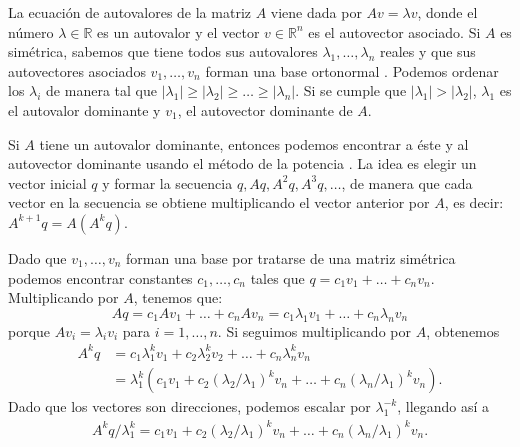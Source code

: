 \documentclass{article}
\begin{document}
La ecuación de autovalores de la matriz $A$ viene dada por $A v = \lambda v$, donde el número $\lambda \in \mathbb{R}$ es un autovalor y el vector $v \in \mathbb{R}^{n}$ es el autovector asociado. Si $A$ es simétrica, sabemos que tiene todos sus autovalores $\lambda_1, \ldots, \lambda_n$ reales y que sus autovectores asociados $v_1, \ldots, v_n$ forman una base ortonormal \citep{strang2022introduction}. Podemos ordenar los $\lambda_i$ de manera tal que $|\lambda_1| \geq |\lambda_2| \geq \ldots \geq |\lambda_n|$. Si se cumple que $|\lambda_1| > |\lambda_2|$, $\lambda_1$ es el autovalor dominante y $v_1$, el autovector dominante de $A$.


Si $A$ tiene un autovalor dominante, entonces podemos encontrar a éste y al autovector dominante usando el método de la potencia \citep{watkins2004fundamentals}. La idea es elegir un vector inicial $q$ y formar la secuencia $q, Aq, A^2q, A^3q, \ldots$, de manera que cada vector en la secuencia se obtiene multiplicando el vector anterior por $A$, es decir: $A^{k+1}q = A(A^{k}q)$. 

Dado que $v_1, \ldots, v_n$ forman una base por tratarse de una matriz simétrica podemos encontrar constantes $c_1, \ldots, c_n$ tales que $q = c_1 v_1 + \ldots + c_n v_n$. Multiplicando por $A$, tenemos que:
%
$$
Aq = c_1 A v_1 + \ldots + c_n A v_n = c_1 \lambda_1 v_1 + \ldots + c_n \lambda_n v_n
$$
%
porque $A v_i = \lambda_i v_i$ para $i = 1, \ldots, n$. Si seguimos multiplicando por $A$, obtenemos
%
\begin{equation} \label{eq:potencia_ecuacion}
\begin{split}
  A^k q &= c_1 \lambda_1^k v_1 + c_2 \lambda_2^k v_2 + \ldots + c_n \lambda_n^k v_n \\
        &= \lambda_1^k (c_1 v_1 + c_2 ({\lambda_2}/{\lambda_1})^k v_n + \ldots + c_n ({\lambda_n}/{\lambda_1})^k v_n).
\end{split}
\end{equation}
%
Dado que los vectores son direcciones, podemos escalar por $\lambda_1^{-k}$, llegando así a
%
\begin{align*}
   A^k q / \lambda_1^{k} = c_1 v_1 + 
    c_2 ({\lambda_2}/{\lambda_1})^k v_n + 
    \ldots +
    c_n ({\lambda_n}/{\lambda_1})^k v_n.
\end{align*} 
\end{document}
